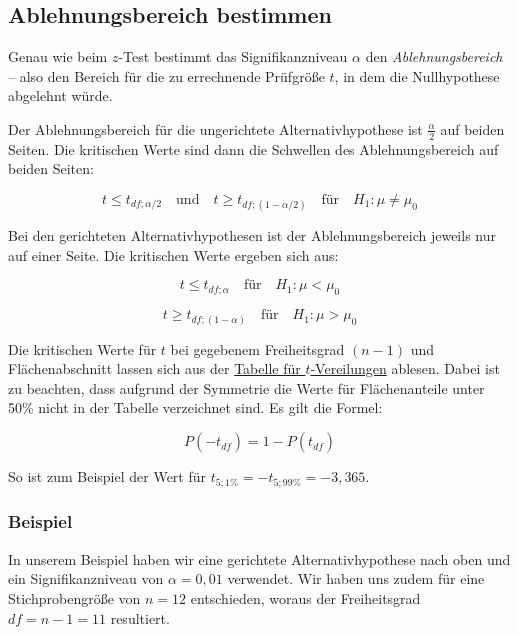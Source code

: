 \documentclass[
  11pt,
  ngerman,
  a4paper,
]{report}
\begin{document}
\hypertarget{ablehnungsbereich-bestimmen-1}{%
\subsection{Ablehnungsbereich bestimmen}\label{ablehnungsbereich-bestimmen-1}}

Genau wie beim \(z\)-Test bestimmt das Signifikanzniveau \(\alpha\) den \emph{Ablehnungsbereich} -- also den Bereich für die zu errechnende Prüfgröße \(t\), in dem die Nullhypothese abgelehnt würde.

Der Ablehnungsbereich für die ungerichtete Alternativhypothese ist \(\frac{\alpha}{2}\) auf beiden Seiten. Die kritischen Werte sind dann die Schwellen des Ablehnungsbereich auf beiden Seiten:

\[
t \leq t_{\mathit{df};\alpha/2} \quad \textrm{und} \quad t \geq t_{\mathit{df};(1-\alpha/2)} \quad \textrm{für} \quad H_1: \mu \neq \mu_0
\label{eq:tkritneq}
\]

Bei den gerichteten Alternativhypothesen ist der Ablehnungsbereich jeweils nur auf einer Seite. Die kritischen Werte ergeben sich aus:

\[
t \leq t_{\mathit{df};\alpha} \quad \textrm{für} \quad H_1: \mu < \mu_0
\label{eq:kritless}
\]

\[
t \geq t_{\mathit{df};(1-\alpha)} \quad \textrm{für} \quad H_1: \mu > \mu_0
\label{eq:kritgreater}
\]

Die kritischen Werte für \(t\) bei gegebenem Freiheitsgrad \((n-1)\) und Flächenabschnitt lassen sich aus der \protect\hyperlink{tabelle-t}{Tabelle für \(t\)-Vereilungen} ablesen. Dabei ist zu beachten, dass aufgrund der Symmetrie die Werte für Flächenanteile unter 50\% nicht in der Tabelle verzeichnet sind. Es gilt die Formel:

\[
P(-t_\mathit{df})=1-P(t_\mathit{df})
\label{eq:negt}
\]

So ist zum Beispiel der Wert für \(t_{5;1\%}=-t_{5;99\%}=-3{,}365\).

\hypertarget{beispiel-9}{%
\subsubsection{Beispiel}\label{beispiel-9}}

In unserem Beispiel haben wir eine gerichtete Alternativhypothese nach oben und ein Signifikanzniveau von \(\alpha=0{,}01\) verwendet. Wir haben uns zudem für eine Stichprobengröße von \(n=12\) entschieden, woraus der Freiheitsgrad \(\mathit{df}=n-1=11\) resultiert.
\end{document}
